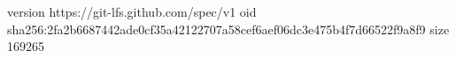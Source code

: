 version https://git-lfs.github.com/spec/v1
oid sha256:2fa2b6687442ade0cf35a42122707a58cef6aef06dc3e475b4f7d66522f9a8f9
size 169265
